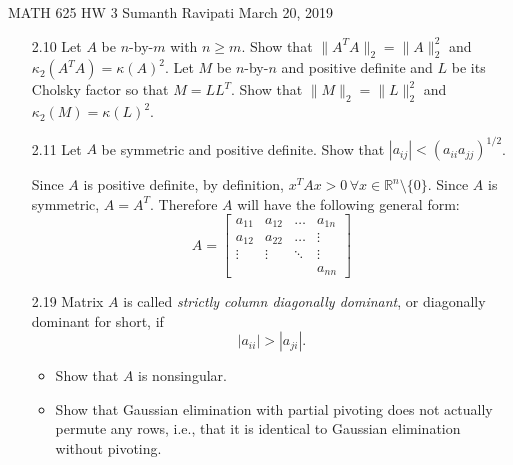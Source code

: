 \documentclass[12pt,letterpaper,reqno]{amsart}
\newcommand{\R}{\mathbb R}
\begin{document}
\thispagestyle{empty}
\begin{center}\large{
    MATH 625\quad
    HW 3\quad
    Sumanth Ravipati\quad
    March 20, 2019}
\end{center}
\vspace{.25in}

\begin{enumerate}
\item[2.10] Let $A$ be $n$-by-$m$ with $n \geq m$. Show that $\|A^TA\|_2 = \|A\|_2^2$ and $\kappa_2(A^TA) = \kappa(A)^2$.\newline
Let $M$ be $n$-by-$n$ and positive definite and $L$ be its Cholsky factor so that $M = LL^T$. Show that $\|M\|_2 = \|L\|_2^2$ and $\kappa_2(M) = \kappa(L)^2$.
\newline
\begin{flushleft}

\end{flushleft}
\newpage

\item[2.11] Let $A$ be symmetric and positive definite. Show that $|a_{ij}| < (a_{ii}a_{jj})^{1/2}$.
\newline
\begin{flushleft}
Since $A$ is positive definite, by definition, $x^TAx > 0\, \forall x \in \R^n\setminus \{0\}$. Since $A$ is symmetric, $A = A^T$. Therefore $A$ will have the following general form:
$$A = \begin{bmatrix} { a _ { 11 } } & {a _ { 12 } } & { \dots } & { a _ { 1 n } } \\ {a _ { 12 } } & {a _ { 22 } } & { \ldots } & { \vdots } \\ {\vdots } & {\vdots } & { \ddots } & { \vdots } \\ { } & { } & { } & { a _ { n n } } \end{bmatrix}$$
\end{flushleft}
\newpage

\item[2.19] Matrix $A$ is called \textit{strictly column diagonally dominant}, or diagonally dominant for short, if
$$|a_{ii}| > |a_{ji}|.$$
\begin{itemize}
    \item Show that $A$ is nonsingular.
    \begin{flushleft}
    
    \end{flushleft}
    \item Show that Gaussian elimination with partial pivoting does not actually permute any rows, i.e., that it is identical to Gaussian elimination without pivoting.
    \begin{flushleft}
    

\end{flushleft}
\end{itemize}
\end{enumerate}
\end{document}
